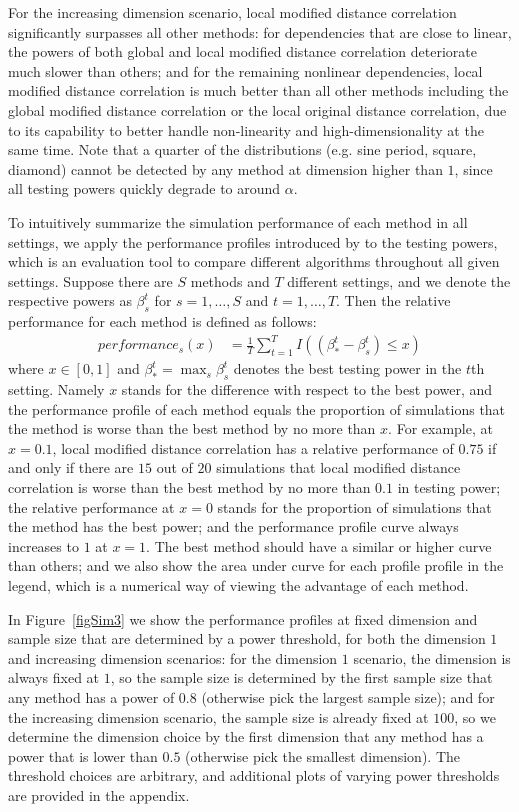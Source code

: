 \documentclass[11pt]{article}
\begin{document}
For the increasing dimension scenario, local modified distance correlation significantly surpasses all other methods: for dependencies that are close to linear, the powers of both global and local modified distance correlation deteriorate much slower than others; and for the remaining nonlinear dependencies, local modified distance correlation is much better than all other methods including the global modified distance correlation or the local original distance correlation, due to its capability to better handle non-linearity and high-dimensionality at the same time. Note that a quarter of the distributions (e.g. sine period, square, diamond) cannot be detected by any method at dimension higher than $1$, since all testing powers quickly degrade to around $\alpha$.

To intuitively summarize the simulation performance of each method in all settings, we apply the performance profiles introduced by \cite{DolanMore2002} to the testing powers, which is an evaluation tool to compare different algorithms throughout all given settings. Suppose there are $S$ methods and $T$ different settings, and we denote the respective powers as $\beta_{s}^{t}$ for $s=1,\ldots,S$ and $t=1,\ldots,T$. Then the relative performance for each method is defined as follows:
\begin{align*}
performance_{s}(x) &= \frac{1}{T} \sum_{t=1}^{T} I((\beta_{*}^{t}-\beta_{s}^{t}) \leq x)
\end{align*}
where $x \in [0,1]$ and $\beta_{*}^{t} =\max_{s} \beta_{s}^{t}$ denotes the best testing power in the $t$th setting. Namely $x$ stands for the difference with respect to the best power, and the performance profile of each method equals the proportion of simulations that the method is worse than the best method by no more than $x$. For example, at $x=0.1$, local modified distance correlation has a relative performance of $0.75$ if and only if there are $15$ out of $20$ simulations that local modified distance correlation is worse than the best method by no more than $0.1$ in testing power; the relative performance at $x=0$ stands for the proportion of simulations that the method has the best power; and the performance profile curve always increases to $1$ at $x=1$. The best method should have a similar or higher curve than others; and we also show the area under curve for each profile profile in the legend, which is a numerical way of viewing the advantage of each method.

In Figure~\ref{figSim3} we show the performance profiles at fixed dimension and sample size that are determined by a power threshold, for both the dimension $1$ and increasing dimension scenarios: for the dimension $1$ scenario, the dimension is always fixed at $1$, so the sample size is determined by the first sample size that any method has a power of $0.8$ (otherwise pick the largest sample size); and for the increasing dimension scenario, the sample size is already fixed at $100$, so we determine the dimension choice by the first dimension that any method has a power that is lower than $0.5$ (otherwise pick the smallest dimension). The threshold choices are arbitrary, and additional plots of varying power thresholds are provided in the appendix.
\end{document}
